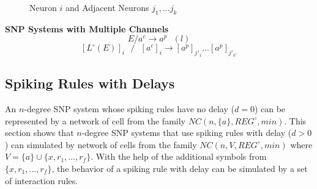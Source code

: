 \documentclass[a4paper]{article}
\theoremstyle{definition}
\newcommand{\ra}{\rightarrow}
\newcommand{\ts}{\text{ }}
\begin{document}
\begin{figure}[H]
\begin{center}                                                                                           
\end{center}                                                                                             
\caption{Neuron $i$ and Adjacent Neurons $j_1,...j_k$}\label{fig-snp2}
\end{figure} 

\noindent \textbf{SNP Systems with Multiple Channels} \cite{peng-2017-multiple-channels}
$$E/a^c \ra a^p\ts (l)$$
$${[L^{\circ}(E)]}_{i}\ts/\ts {[a^c]}_i \ra {[a^p]}_{j'_1}...{[a^p]}_{j'_{k'}}$$


\subsection{Spiking Rules with Delays}

An $n$-degree SNP system whose spiking rules have no delay ($d =0$) can be represented by a network 
of cell from the family $NC(n,\{a\}, REG^{\circ}, min)$. This section shows that $n$-degree SNP 
systems that use spiking rules with delay ($d > 0$) can simulated by network of cells from the 
family $NC(n, V, REG^{\circ}, min)$ where $V = \{a\} \cup \{x,r_1,...,r_f\}$. With the help of the
additional symbols from $\{x,r_1,...,r_f\}$, the behavior of a spiking rule with delay can be 
simulated by a set of interaction rules. 
\end{document}
